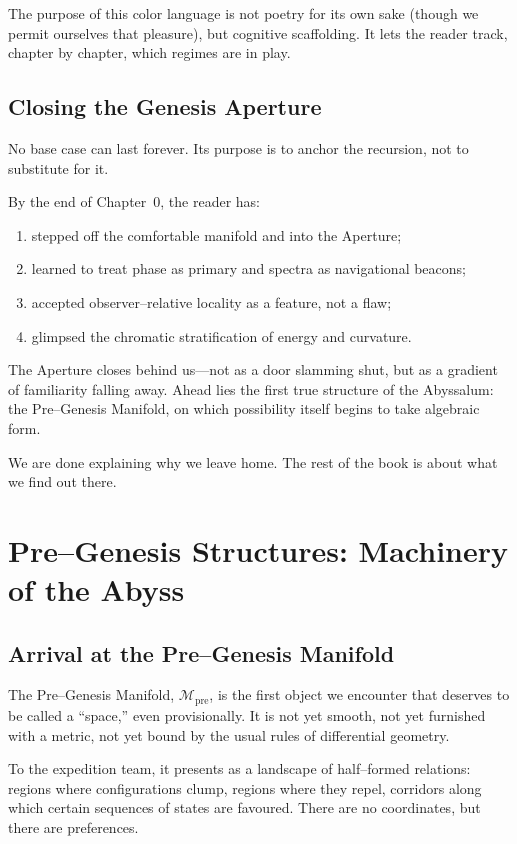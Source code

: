 The purpose of this color language is not poetry for its own sake (though we permit ourselves
that pleasure), but cognitive scaffolding. It lets the reader track, chapter by chapter, which
regimes are in play.

\section{Closing the Genesis Aperture}
No base case can last forever. Its purpose is to anchor the recursion, not to substitute for it.

By the end of Chapter~0, the reader has:
\begin{enumerate}
  \item stepped off the comfortable manifold and into the Aperture;
  \item learned to treat phase as primary and spectra as navigational beacons;
  \item accepted observer–relative locality as a feature, not a flaw;
  \item glimpsed the chromatic stratification of energy and curvature.
\end{enumerate}

The Aperture closes behind us—not as a door slamming shut, but as a gradient of familiarity
falling away. Ahead lies the first true structure of the Abyssalum: the Pre–Genesis Manifold, on
which possibility itself begins to take algebraic form.

We are done explaining why we leave home.
The rest of the book is about what we find out there.

\chapter{Pre–Genesis Structures: Machinery of the Abyss}
\label{ch:pre-genesis}

\section{Arrival at the Pre–Genesis Manifold}
The Pre–Genesis Manifold, $\mathcal{M}_\mathrm{pre}$, is the first object we encounter that
deserves to be called a ``space,'' even provisionally. It is not yet smooth, not yet furnished
with a metric, not yet bound by the usual rules of differential geometry.

To the expedition team, it presents as a landscape of half–formed relations:
regions where configurations clump, regions where they repel, corridors along which certain
sequences of states are favoured. There are no coordinates, but there are preferences.


